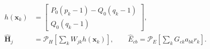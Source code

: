 \documentclass[12pt]{article}
\begin{document}
\fontsize{23}{29}\selectfont\[
\begin{aligned}h(\mathbf x_k)&=\begin{bmatrix}P_0(p_k-1)-Q_0(q_k-1)\\Q_0(q_k-1)\end{bmatrix},\\\widehat{\mathbf H}_j&=\mathcal P_H\!\left[\sum_k W_{jk}h(\mathbf x_k)\right],\qquad \widehat E_{cb}=\mathcal P_E\!\left[\sum_k G_{ck}a_{bk}r_k\right].\end{aligned}
\]
\end{document}

